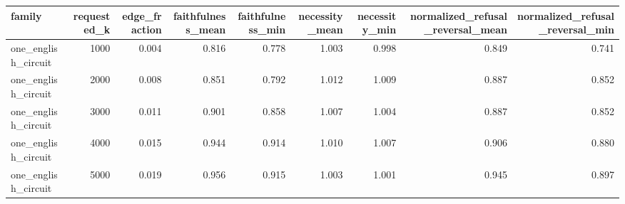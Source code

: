 \begin{tabular}{lrrrrrrrr}
\toprule
family & requested\_k & edge\_fraction & faithfulness\_mean & faithfulness\_min & necessity\_mean & necessity\_min & normalized\_refusal\_reversal\_mean & normalized\_refusal\_reversal\_min \\
\midrule
one\_english\_circuit & 1000 & 0.004 & 0.816 & 0.778 & 1.003 & 0.998 & 0.849 & 0.741 \\
one\_english\_circuit & 2000 & 0.008 & 0.851 & 0.792 & 1.012 & 1.009 & 0.887 & 0.852 \\
one\_english\_circuit & 3000 & 0.011 & 0.901 & 0.858 & 1.007 & 1.004 & 0.887 & 0.852 \\
one\_english\_circuit & 4000 & 0.015 & 0.944 & 0.914 & 1.010 & 1.007 & 0.906 & 0.880 \\
one\_english\_circuit & 5000 & 0.019 & 0.956 & 0.915 & 1.003 & 1.001 & 0.945 & 0.897 \\
\bottomrule
\end{tabular}
